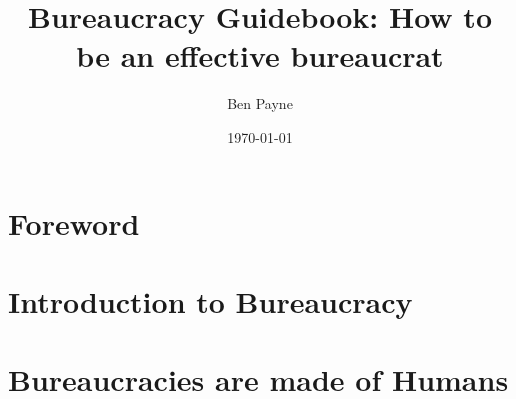 \documentclass{book}
\title{Bureaucracy Guidebook: How to be an effective bureaucrat}
\author{Ben Payne}
\date{\today}
\begin{document}
\maketitle
\frontmatter %



\chapter*{Foreword}%


\tableofcontents

\mainmatter %



\chapter{Introduction to Bureaucracy}



\chapter{Bureaucracies are made of Humans}









\clearpage

\printglossaries

\nocite{*} %


\end{document}
